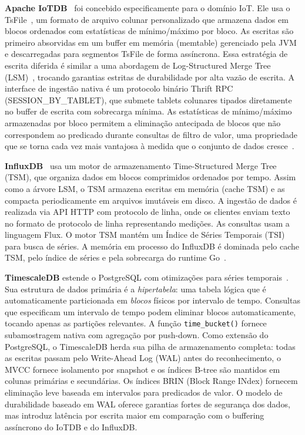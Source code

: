 \textbf{Apache IoTDB}~\cite{wang2023iotdb} foi concebido especificamente para o domínio IoT.
Ele usa o TsFile~\citep{zhao2024tsfile}, um formato de arquivo colunar personalizado que armazena dados em blocos
ordenados com estatísticas de mínimo/máximo por bloco. As escritas são primeiro absorvidas em
um buffer em memória (memtable) gerenciado pela JVM e descarregadas para segmentos TsFile
de forma assíncrona. Essa estratégia de escrita diferida é similar a uma abordagem de
Log-Structured Merge Tree (LSM)~\citep{oneil1996lsm}, trocando garantias estritas de durabilidade por alta vazão
de escrita. A interface de ingestão nativa é um protocolo binário Thrift RPC
(SESSION\_BY\_TABLET), que submete tablets colunares tipados diretamente no buffer de escrita
com sobrecarga mínima. As estatísticas de mínimo/máximo armazenadas por bloco permitem a
eliminação antecipada de blocos que não correspondem ao predicado durante consultas de filtro
de valor, uma propriedade que se torna cada vez mais vantajosa à medida que o conjunto de
dados cresce~\citep{wang2023iotdb}.

\textbf{InfluxDB}~\cite{naqvi2017influxdb} usa um motor de armazenamento Time-Structured Merge
Tree (TSM), que organiza dados em blocos comprimidos ordenados por tempo. Assim como a árvore
LSM, o TSM armazena escritas em memória (cache TSM) e as compacta periodicamente em arquivos
imutáveis em disco. A ingestão de dados é realizada via API HTTP com protocolo de linha, onde
os clientes enviam texto no formato de protocolo de linha representando medições. As consultas
usam a linguagem Flux. O motor TSM mantém um Índice de Séries Temporais (TSI) para busca de
séries. A memória em processo do InfluxDB é dominada pelo cache TSM, pelo índice de séries e
pela sobrecarga do runtime Go~\citep{naqvi2017influxdb}.

\textbf{TimescaleDB} estende o PostgreSQL com otimizações para séries temporais~\citep{timescaledb}.
Sua estrutura de dados primária é a \textit{hipertabela}: uma tabela lógica que é
automaticamente particionada em \textit{blocos} físicos por intervalo de tempo. Consultas que
especificam um intervalo de tempo podem eliminar blocos automaticamente, tocando apenas as
partições relevantes. A função \texttt{time\_bucket()} fornece subamostragem nativa com
agregação por push-down. Como extensão do PostgreSQL, o TimescaleDB herda sua pilha de
armazenamento completa: todas as escritas passam pelo Write-Ahead Log (WAL) antes do
reconhecimento, o MVCC fornece isolamento por snapshot e os índices B-tree são mantidos em
colunas primárias e secundárias. Os índices BRIN (Block Range INdex) fornecem eliminação leve
baseada em intervalos para predicados de valor. O modelo de durabilidade baseado em WAL
oferece garantias fortes de segurança dos dados, mas introduz latência por escrita maior em
comparação com o buffering assíncrono do IoTDB e do InfluxDB.

